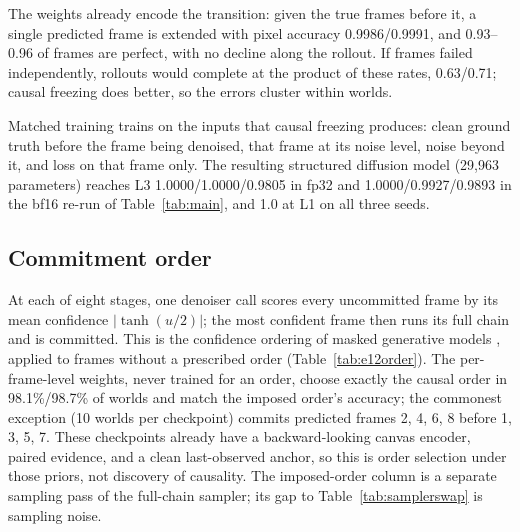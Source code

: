 \documentclass[11pt]{article}
\begin{document}
The weights already encode the transition: given the true frames before it, a single predicted frame is extended with pixel accuracy 0.9986/0.9991, and 0.93--0.96 of frames are perfect, with no decline along the rollout. If frames failed independently, rollouts would complete at the product of these rates, 0.63/0.71; causal freezing does better, so the errors cluster within worlds.

Matched training trains on the inputs that causal freezing produces: clean ground truth before the frame being denoised, that frame at its noise level, noise beyond it, and loss on that frame only. The resulting structured diffusion model (29{,}963 parameters) reaches L3 1.0000/1.0000/0.9805 in fp32 and 1.0000/0.9927/0.9893 in the bf16 re-run of Table~\ref{tab:main}, and 1.0 at L1 on all three seeds.

\subsection{Commitment order}

At each of eight stages, one denoiser call scores every uncommitted frame by its mean confidence $|\tanh(u/2)|$; the most confident frame then runs its full chain and is committed. This is the confidence ordering of masked generative models \citep{chang2022maskgit, kim2025train}, applied to frames without a prescribed order (Table~\ref{tab:e12order}). The per-frame-level weights, never trained for an order, choose exactly the causal order in 98.1\%/98.7\% of worlds and match the imposed order's accuracy; the commonest exception (10 worlds per checkpoint) commits predicted frames 2, 4, 6, 8 before 1, 3, 5, 7. These checkpoints already have a backward-looking canvas encoder, paired evidence, and a clean last-observed anchor, so this is order selection under those priors, not discovery of causality. The imposed-order column is a separate sampling pass of the full-chain sampler; its gap to Table~\ref{tab:samplerswap} is sampling noise.
\end{document}
